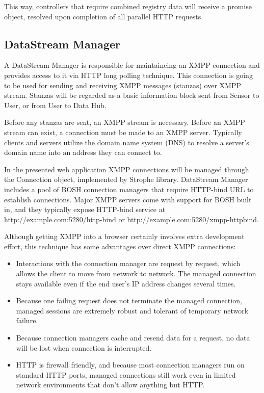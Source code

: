 This way, controllers that require combined registry data will receive a promise object, resolved upon completion of all parallel HTTP requests.

\subsection{DataStream Manager}
A DataStream Manager is responsible for maintaineing an XMPP connection and provides access to it via HTTP long polling technique. This connection is going to be used for sending and receiving XMPP messages (stanzas) over XMPP stream. Stanzas will be regarded as a basic information block sent from Sensor to User, or from User to Data Hub.

Before any stanzas are sent, an XMPP stream is necessary. Before an XMPP stream can exist, a connection must be made to an XMPP server. Typically clients and servers utilize the domain name system (DNS) to resolve a server's domain name into an address they can connect to.

In the presented web application XMPP connections will be managed through the Connection object, implemented by Strophe library. DataStream Manager includes a pool of BOSH connection managers that require HTTP-bind URL to establish connections. Major XMPP servers come with support for BOSH built in, and they typically expose HTTP-bind service at http://example.com:5280/http-bind or http://example.com:5280/xmpp-httpbind.

Although getting XMPP into a browser certainly involves extra development effort, this technique has some advantages over direct XMPP connections:
\begin{itemize}
\item Interactions with the connection manager are request by request, which allows the client to move from network to network. The managed connection stays available even if the end user's IP address changes several times.
\item Because one failing request does not terminate the managed connection, managed sessions are extremely robust and tolerant of temporary network failure.
\item Because connection managers cache and resend data for a request, no data will be lost when connection is interrupted.
\item HTTP is firewall friendly, and because most connection managers run on standard HTTP ports, managed connections still work even in limited network environments that don’t allow anything but HTTP.
\end{itemize}

